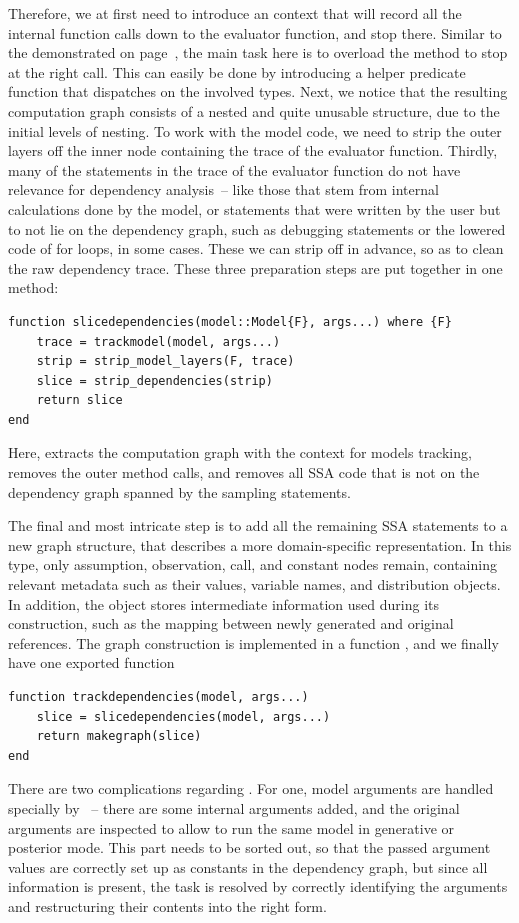 Therefore, we at first need to introduce an \irtrackerjl{} context that will record all the internal
function calls down to the evaluator function, and stop there.  Similar to the
 demonstrated on page~\pageref{lst:depthlimitcontext}, the main task here
is to overload the  method to stop at the right call.  This can easily be done by
introducing a helper predicate function  that dispatches on the involved types.
Next, we notice that the resulting computation graph consists of a nested and quite unusable
structure, due to the initial levels of nesting.  To work with the model code, we need to strip the
outer layers off the inner node containing the trace of the evaluator function.  Thirdly, many of
the statements in the trace of the evaluator function do not have relevance for dependency
analysis~-- like those that stem from internal calculations done by the model, or statements that
were written by the user but to not lie on the dependency graph, such as debugging statements or the
lowered code of for loops, in some cases.  These we can strip off in advance, so as to clean the raw
dependency trace.  These three preparation steps are put together in one method:
\begin{lstlisting}
function slicedependencies(model::Model{F}, args...) where {F}
    trace = trackmodel(model, args...)
    strip = strip_model_layers(F, trace)
    slice = strip_dependencies(strip)
    return slice
end
\end{lstlisting}
Here,  extracts the computation graph with the context for models tracking,
 removes the outer method calls, and  removes
all SSA code that is not on the dependency graph spanned by the sampling statements.

The final and most intricate step is to add all the remaining SSA statements to a new graph
structure, that describes a more domain-specific representation.  In this  type, only
assumption, observation, call, and constant nodes remain, containing relevant metadata such as their
values, variable names, and distribution objects.  In addition, the object stores intermediate
information used during its construction, such as the mapping between newly generated and original
references.  The graph construction is implemented in a function , and we finally
have one exported function
\begin{lstlisting}
function trackdependencies(model, args...)
    slice = slicedependencies(model, args...)
    return makegraph(slice)
end
\end{lstlisting}
There are two complications regarding .  For one, model arguments are handled
specially by \dppljl{}~-- there are some internal arguments added, and the original arguments are
inspected to allow to run the same model in generative or posterior mode.  This part needs to be
sorted out, so that the passed argument values are correctly set up as constants in the dependency
graph, but since all information is present, the task is resolved by correctly identifying the
arguments and restructuring their contents into the right form.

